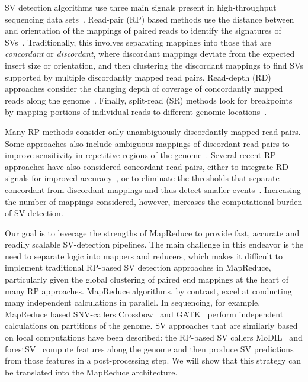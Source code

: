 \documentclass{bioinfo}
\begin{document}
SV detection algorithms use three main signals present in high-throughput sequencing data sets~\citep{Alkan:2011p547}. Read-pair (RP) based methods use the distance between and orientation of the mappings of paired reads to identify the signatures of SVs~\citep{Campbell:2008p539,Chen:2009p3,Sindi:2009gu,Korbel:2009dy}. Traditionally, this involves separating mappings into those that are \emph{concordant} or \emph{discordant}, where discordant mappings deviate from the expected insert size or orientation, and then clustering the discordant mappings to find SVs supported by multiple discordantly mapped read pairs. Read-depth (RD) approaches consider the changing depth of coverage of concordantly mapped reads along the genome~\citep{Alkan:2009cr,Yoon:2009kb,Chiang:2009di}. Finally, split-read (SR) methods look for breakpoints by mapping portions of individual reads to different genomic locations~\citep{Wang:2011p1607,Ye:2009p2}.

Many RP methods consider only unambiguously discordantly mapped read pairs. Some approaches also include ambiguous mappings of discordant read pairs to improve sensitivity in repetitive regions of the genome~\citep{Hormozdiari:2009p284,Quinlan:2010gf}. Several recent RP approaches have also considered concordant read pairs, either to integrate RD signals for improved accuracy~\citep{Sindi:2012kk,Michaelson:2012fj,Chiara:2012ey}, or to eliminate the thresholds that separate concordant from discordant mappings and thus detect smaller events~\citep{Marschall:2012ek}. Increasing the number of mappings considered, however, increases the computational burden of SV detection. 

Our goal is to leverage the strengths of MapReduce to provide fast, accurate and readily scalable SV-detection pipelines. The main challenge in this endeavor is the need to separate logic into mappers and reducers, which makes it difficult to implement traditional RP-based SV detection approaches in MapReduce, particularly given the global clustering of paired end mappings at the heart of many RP approaches. MapReduce algorithms, by contrast, excel at conducting many independent calculations in parallel. In sequencing, for example, MapReduce based SNV-callers Crossbow~\citep{Langmead:2009p1225} and GATK~\citep{McKenna:2010p1051} perform independent calculations on partitions of the genome. SV approaches that are similarly based on local computations have been described: the RP-based SV callers MoDIL~\citep{Lee:2009da} and forestSV~\citep{Michaelson:2012fj} compute features along the genome and then produce SV predictions from those features in a post-processing step. We will show that this strategy can be translated into the MapReduce architecture.
\end{document}
